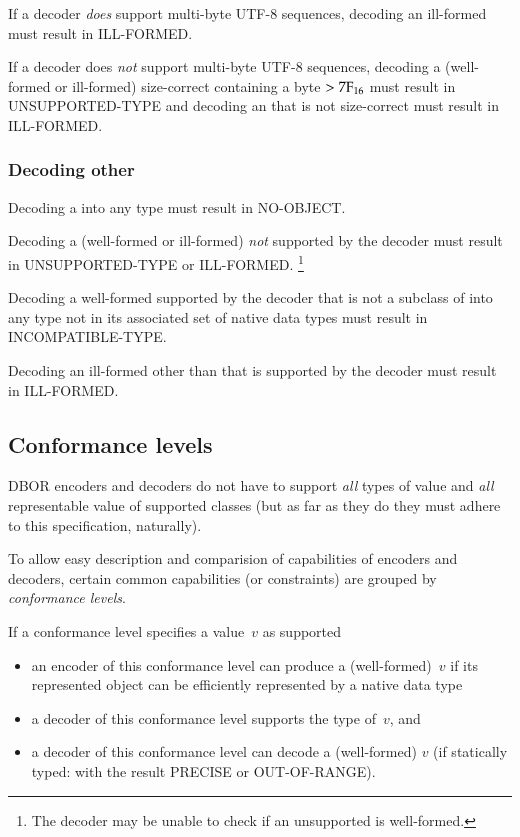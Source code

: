 \medskip
If a decoder \emph{does} support multi-byte UTF-8 sequences,
decoding an ill-formed \DborUtfEightStringValue{} must result in ILL-FORMED.

\medskip
If a decoder does \emph{not} support multi-byte UTF-8 sequences,
decoding a (well-formed or ill-formed) size-correct \DborUtfEightStringValue{} containing a byte $> \mathrm{7F}_{16}$
must result in UNSUPPORTED-TYPE and
decoding an \DborUtfEightStringValue{} that is not size-correct must result in ILL-FORMED.


\subsubsection{Decoding other \DborValue}

Decoding a \DborNoneValue{} into any type must result in NO-OBJECT.

\medskip
Decoding a (well-formed or ill-formed) \DborValue{} \emph{not} supported by the decoder
must result in UNSUPPORTED-TYPE or ILL-FORMED.%
\footnote{%
    The decoder may be unable to check if an unsupported \DborValue{} is well-formed.
}

\medskip
Decoding a well-formed \DborValue{} supported by the decoder that is not a subclass of \DborNumberValue{}
into any type not in its associated set of native data types must result in INCOMPATIBLE-TYPE.

\medskip
Decoding an ill-formed \DborValue{} other than \DborUtfEightStringValue{}
that is supported by the decoder must result in ILL-FORMED.


\subsection{Conformance levels}
\label{sec:conformancelevels}

DBOR encoders and decoders do not have to support \emph{all} types of value and \emph{all} representable value
of supported classes (but as far as they do they must adhere to this specification, naturally).

To allow easy description and comparision of capabilities of encoders and decoders,
certain common capabilities (or constraints) are grouped by \emph{conformance levels}.

If a conformance level specifies a value~$v$ as supported
\begin{itemize}
    \item
    an encoder of this conformance level can produce a (well-formed)~$v$ if its represented object can be
    efficiently represented by a native data type

    \item
    a decoder of this conformance level supports the type of~$v$, and

    \item
    a decoder of this conformance level can decode a (well-formed) $v$
    (if statically typed: with the result PRECISE or OUT-OF-RANGE).
\end{itemize}

